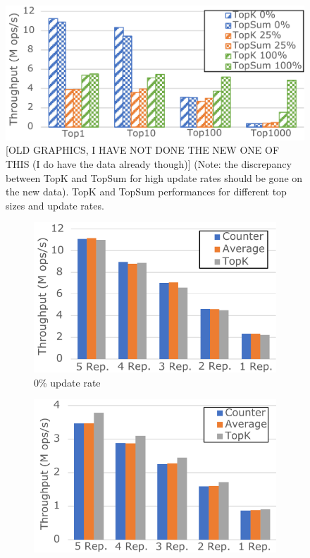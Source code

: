 \documentclass[sigplan,10pt]{acmart}
\begin{document}
\begin{figure}[h]
	\centering
	\includegraphics[width=.5\linewidth]{TopKVSTopSum_cut}
	\caption{[OLD GRAPHICS, I HAVE NOT DONE THE NEW ONE OF THIS (I do have the data already though)] (Note: the discrepancy between TopK and TopSum for high update rates should be gone on the new data). TopK and TopSum performances for different top sizes and update rates.}
	\label{fig:(new)TopkVSTopsum}
\end{figure}

\begin{figure}[h]
	\centering
	\begin{subfigure}{.33\linewidth}
		\centering
		\includegraphics[width=.97\linewidth]{CounterAvgTopK0upd_v2_cut}
		\caption{0\% update rate}
		\label{fig:(new)CounterAvgTopK0upd}
	\end{subfigure}%
	\begin{subfigure}{.33\linewidth}
		\centering
		\includegraphics[width=.97\linewidth]{CounterAvgTopK25upd_v2_cut}

\end{subfigure}
\end{figure}
\end{document}
